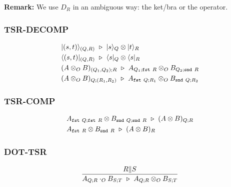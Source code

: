 \textbf{Remark: } We use $D_R$ in an ambiguous way: the ket/bra or the operator.

\subsubsection*{\textsf{TSR-DECOMP}}

\begin{align*}
  & |(s, t)\rangle_{(Q, R)} \ \triangleright\  |s\rangle_{Q} \otimes |t\rangle_{R} \\
  & \langle (s, t)|_{(Q, R)} \ \triangleright\  \langle s|_{Q} \otimes \langle s|_{R} \\
  & (A \otimes_O B)_{(Q_1, Q_2); R} \ \triangleright\  A_{Q_1; \texttt{fst}\ R} \otimes_O B_{Q_2; \texttt{snd}\ R} \\
  & (A \otimes_O B)_{Q; (R_1, R_2)} \ \triangleright\  A_{\texttt{fst}\ Q; R_1} \otimes_O B_{\texttt{snd}\ Q; R_2} \\
\end{align*}


\subsubsection*{\textsf{TSR-COMP}}
\begin{align*}
  & A_{\texttt{fst}\ Q; \texttt{fst}\ R} \otimes B_{\texttt{snd}\ Q; \texttt{snd}\ R} \ \triangleright\  (A \otimes B)_{Q; R} \\
  & A_{\texttt{fst}\ R} \otimes B_{\texttt{snd}\ R} \ \triangleright\  (A \otimes B)_{R}
\end{align*}

\subsubsection*{\textsf{DOT-TSR}}
\begin{align*}
  \frac{R \| S}{A_{Q; R} \cdot_O B_{S; T} \ \triangleright\  A_{Q; R} \otimes_O B_{S; T}}
\end{align*}

